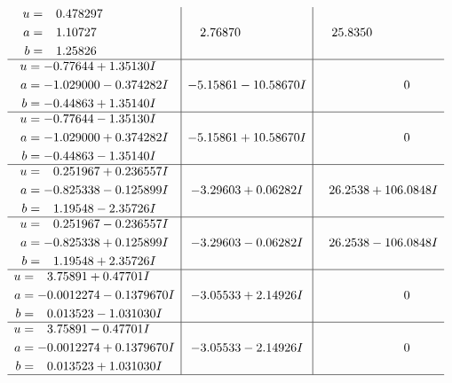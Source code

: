 \documentclass[1p]{elsarticle_modified}
\theoremstyle{definition}
\begin{document}
$$\begin{array}{c|c|c}
\begin{aligned}
u &= \phantom{-}0.478297\phantom{ +0.000000I} \\
a &= \phantom{-}1.10727\phantom{ +0.000000I} \\
b &= \phantom{-}1.25826\phantom{ +0.000000I}\end{aligned}
 & \phantom{-}2.76870\phantom{ +0.000000I} & \phantom{-}25.8350\phantom{ +0.000000I} \\ \hline\begin{aligned}
u &= -0.77644 + 1.35130 I \\
a &= -1.029000 - 0.374282 I \\
b &= -0.44863 + 1.35140 I\end{aligned}
 & -5.15861 - 10.58670 I & \phantom{-0.000000 } 0 \\ \hline\begin{aligned}
u &= -0.77644 - 1.35130 I \\
a &= -1.029000 + 0.374282 I \\
b &= -0.44863 - 1.35140 I\end{aligned}
 & -5.15861 + 10.58670 I & \phantom{-0.000000 } 0 \\ \hline\begin{aligned}
u &= \phantom{-}0.251967 + 0.236557 I \\
a &= -0.825338 - 0.125899 I \\
b &= \phantom{-}1.19548 - 2.35726 I\end{aligned}
 & -3.29603 + 0.06282 I & \phantom{-}26.2538 + 106.0848 I \\ \hline\begin{aligned}
u &= \phantom{-}0.251967 - 0.236557 I \\
a &= -0.825338 + 0.125899 I \\
b &= \phantom{-}1.19548 + 2.35726 I\end{aligned}
 & -3.29603 - 0.06282 I & \phantom{-}26.2538 - 106.0848 I \\ \hline\begin{aligned}
u &= \phantom{-}3.75891 + 0.47701 I \\
a &= -0.0012274 - 0.1379670 I \\
b &= \phantom{-}0.013523 - 1.031030 I\end{aligned}
 & -3.05533 + 2.14926 I & \phantom{-0.000000 } 0 \\ \hline\begin{aligned}
u &= \phantom{-}3.75891 - 0.47701 I \\
a &= -0.0012274 + 0.1379670 I \\
b &= \phantom{-}0.013523 + 1.031030 I\end{aligned}
 & -3.05533 - 2.14926 I & \phantom{-0.000000 } 0\\
 \hline 
 \end{array}$$\newpage\newpage\renewcommand{\arraystretch}{1}
\end{document}
